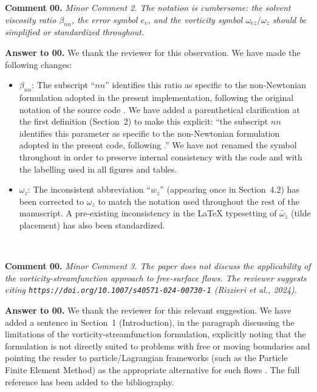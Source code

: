 \documentclass[12pt]{article}
\newcounter{question}
\newcommand{\name}{00}
\newcommand{\question}[1]{\stepcounter{question} \noindent \textbf{Comment \name.\thequestion} \emph{#1} }
\newcommand{\answer}[1]{\noindent \textbf{Answer to \name.\thequestion} #1 \mbox{}\\}
\begin{document}
\vspace{3mm}

\question{Minor Comment 2. The notation is cumbersome: the solvent viscosity ratio $\beta_{nn}$, the error symbol $e_v$, and the vorticity symbol $\omega_{ez}/\omega_z$ should be simplified or standardized throughout.}

\answer{We thank the reviewer for this observation. We have made the following changes:
\begin{itemize}
  \item $\beta_{nn}$: The subscript ``$nn$'' identifies this ratio as specific to the non-Newtonian formulation adopted in the present implementation, following the original notation of the source code \citep{souza2003}. We have added a parenthetical clarification at the first definition (Section~2) to make this explicit: ``the subscript $nn$ identifies this parameter as specific to the non-Newtonian formulation adopted in the present code, following \citealt{souza2003}.'' We have not renamed the symbol throughout in order to preserve internal consistency with the code and with the labelling used in all figures and tables.
  \item $\omega_z$: The inconsistent abbreviation ``$w_z$'' (appearing once in Section~4.2) has been corrected to $\omega_z$ to match the notation used throughout the rest of the manuscript. A pre-existing inconsistency in the LaTeX typesetting of $\widetilde{\omega_z}$ (tilde placement) has also been standardized.
\end{itemize}}

\vspace{3mm}

\question{Minor Comment 3. The paper does not discuss the applicability of the vorticity-streamfunction approach to free-surface flows. The reviewer suggests citing \texttt{https://doi.org/10.1007/s40571-024-00730-1} (Rizzieri et al., 2024).}

\answer{We thank the reviewer for this relevant suggestion. We have added a sentence in Section~1 (Introduction), in the paragraph discussing the limitations of the vorticity-streamfunction formulation, explicitly noting that the formulation is not directly suited to problems with free or moving boundaries and pointing the reader to particle/Lagrangian frameworks (such as the Particle Finite Element Method) as the appropriate alternative for such flows \citep{Rizzieri2024}. The full reference has been added to the bibliography.}
\end{document}
